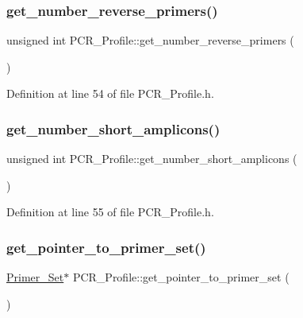 \subsubsection{\texorpdfstring{get\+\_\+number\+\_\+reverse\+\_\+primers()}{get\_number\_reverse\_primers()}}
{\footnotesize\ttfamily unsigned int P\+C\+R\+\_\+\+Profile\+::get\+\_\+number\+\_\+reverse\+\_\+primers (\begin{DoxyParamCaption}{ }\end{DoxyParamCaption})\hspace{0.3cm}{\ttfamily [inline]}}



Definition at line 54 of file P\+C\+R\+\_\+\+Profile.\+h.

\mbox{\label{class_p_c_r___profile_ae1470db4482cb29be8e29b96f913023c}} 
\subsubsection{\texorpdfstring{get\+\_\+number\+\_\+short\+\_\+amplicons()}{get\_number\_short\_amplicons()}}
{\footnotesize\ttfamily unsigned int P\+C\+R\+\_\+\+Profile\+::get\+\_\+number\+\_\+short\+\_\+amplicons (\begin{DoxyParamCaption}{ }\end{DoxyParamCaption})\hspace{0.3cm}{\ttfamily [inline]}}



Definition at line 55 of file P\+C\+R\+\_\+\+Profile.\+h.

\mbox{\label{class_p_c_r___profile_a24577af6213a4f6ae4215d19836c5673}} 
\subsubsection{\texorpdfstring{get\+\_\+pointer\+\_\+to\+\_\+primer\+\_\+set()}{get\_pointer\_to\_primer\_set()}}
{\footnotesize\ttfamily \mbox{\hyperlink{class_primer___set}{Primer\+\_\+\+Set}}$\ast$ P\+C\+R\+\_\+\+Profile\+::get\+\_\+pointer\+\_\+to\+\_\+primer\+\_\+set (\begin{DoxyParamCaption}{ }\end{DoxyParamCaption})\hspace{0.3cm}{\ttfamily [inline]}}



